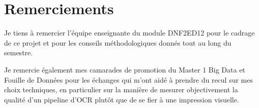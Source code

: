 \chapter*{Remerciements}

Je tiens à remercier l'équipe enseignante du module DNF2ED12 pour le cadrage de ce projet et pour les conseils méthodologiques donnés tout au long du semestre.

Je remercie également mes camarades de promotion du Master 1 Big Data et Fouille de Données pour les échanges qui m'ont aidé à prendre du recul sur mes choix techniques, en particulier sur la manière de mesurer objectivement la qualité d'un pipeline d'OCR plutôt que de se fier à une impression visuelle.
